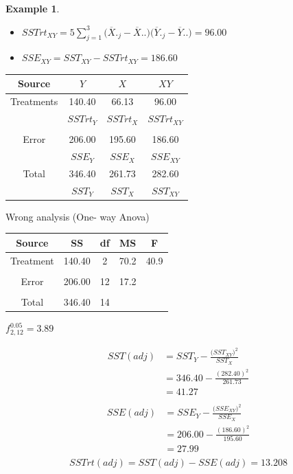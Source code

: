 \documentclass[11pt,a4paper]{article}
\theoremstyle{definition}
\newtheorem{exa}[thm]{Example}
\begin{document}
\begin{exa}
\begin{itemize}
\item[] $SSTrt_{XY} = \displaystyle{5\sum^3_{j=1}\big(\overline{X}._j-\overline{X}..\big)\big(\overline{Y}._j-\overline{Y}..\big) = 96.00}$

\item[] $SSE_{XY} = SST_{XY}-SSTrt_{XY}=186.60$\\
\end{itemize}


\begin{table}[H]
\centering
\begin{tabular}{|c|ccc|}
\hline
Source & $Y$ & $X$ & $XY$\\
\hline
Treatments & 140.40 & 66.13 & 96.00\\
           & $SSTrt_Y$ & $SSTrt_X$ & $SSTrt_{XY}$\\
&&&\\
Error & 206.00 & 195.60 & 186.60\\
     & $SSE_Y$ & $SSE_X$ & $SSE_{XY}$\\
\hline
Total & 346.40 & 261.73 & 282.60\\
     & $SST_Y$ & $SST_X$ & $SST_{XY}$\\
\hline
\end{tabular}
\end{table}


Wrong analysis (One- way Anova)

\begin{table}[H]
\centering
\begin{tabular}{|c|cccc|}
\hline
Source & SS & df & MS & F\\
\hline
Treatment & 140.40 & 2 & 70.2 & 40.9\\
&&&&\\
Error & 206.00 & 12 & 17.2 & \\
&&&&\\
\hline
Total & 346.40 & 14 & &\\
\hline
\end{tabular}
\qquad  $f^{0.05}_{2,12}=3.89$\\
\end{table}


\begin{align*}
SST (adj) & = SST_Y - \frac{\big(SST_{XY}\big)^2}{SST_X}\\
          & = 346.40-\frac{(282.40)^2}{261.73}\\
          & = 41.27\\
\end{align*}
\begin{align*}
SSE(adj) & = SSE_Y - \frac{\big(SSE_{XY}\big)^2}{SSE_X}\\
         & = 206.00 - \frac{(186.60)^2}{195.60}\\
         & = 27.99\\
\end{align*}
$$SSTrt(adj)= SST(adj)-SSE(adj)=13.208$$\\



\end{exa}
\end{document}
